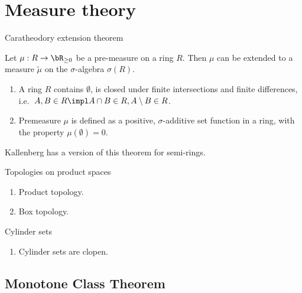 \section{Measure theory}


\begin{frame}
    {Caratheodory extension theorem}
        
    \begin{theorem}
        Let $\mu: R \to \bR_{\geq 0}$ be a pre-measure on a ring $R$. Then $\mu$
        can be extended to a measure $\tilde\mu$ on the $\sigma$-algebra $\sigma(R)$. 
    \end{theorem}

    \begin{enumerate}
        \item A ring $R$ contains $\emptyset$, is closed under finite
            intersections and finite differences, i.e.\ $A,B\in R \impl A\cap
            B\in R, A\setminus B\in R$. 
        \item Premeasure $\mu$ is defined as a positive, $\sigma$-additive set
            function in a ring, with the property $\mu(\emptyset)=0$.
    \end{enumerate}

    Kallenberg has a version of this theorem for semi-rings. 
\end{frame}


\begin{frame}
    {Topologies on product spaces}
    
    \begin{enumerate}
        \item Product topology. 
        \item Box topology.
    \end{enumerate}


\end{frame}

\begin{frame}
    {Cylinder sets}
    
    \begin{enumerate}
        \item Cylinder sets are clopen.
    \end{enumerate}


\end{frame}


\subsection{Monotone Class Theorem}

